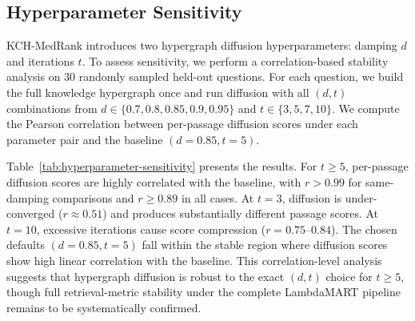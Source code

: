 \subsection{Hyperparameter Sensitivity}

KCH-MedRank introduces two hypergraph diffusion hyperparameters: damping $d$ and iterations $t$. To assess sensitivity, we perform a correlation-based stability analysis on 30 randomly sampled held-out questions. For each question, we build the full knowledge hypergraph once and run diffusion with all $(d, t)$ combinations from $d \in \{0.7, 0.8, 0.85, 0.9, 0.95\}$ and $t \in \{3, 5, 7, 10\}$. We compute the Pearson correlation between per-passage diffusion scores under each parameter pair and the baseline $(d=0.85, t=5)$.



Table~\ref{tab:hyperparameter-sensitivity} presents the results. For $t \geq 5$, per-passage diffusion scores are highly correlated with the baseline, with $r > 0.99$ for same-damping comparisons and $r \geq 0.89$ in all cases. At $t = 3$, diffusion is under-converged ($r \approx 0.51$) and produces substantially different passage scores. At $t = 10$, excessive iterations cause score compression ($r = 0.75\text{--}0.84$). The chosen defaults $(d=0.85, t=5)$ fall within the stable region where diffusion scores show high linear correlation with the baseline. This correlation-level analysis suggests that hypergraph diffusion is robust to the exact $(d, t)$ choice for $t \geq 5$, though full retrieval-metric stability under the complete LambdaMART pipeline remains to be systematically confirmed.
